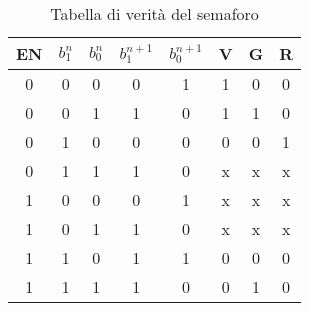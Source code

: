 \begin{table}[h]
	\centering
	\begin{tabular}{cccccccc}		
		 EN& $b_{1}^{n}$& $b_{0}^{n}$& $b_{1}^{n+1}$& $b_{0}^{n+1}$ &V & G& R\\
		 \midrule 
		  0 & 0 & 0 & 0 & 1 & 1 & 0 & 0 \\
		  0 & 0 & 1 & 1 & 0 & 1 & 1 & 0 \\
		  0 & 1 & 0 & 0 & 0 & 0 & 0 & 1 \\
          0 & 1 & 1 & 1 & 0 & x & x & x \\
		  1 & 0 & 0 & 0 & 1 & x & x & x \\
		  1 & 0 & 1 & 1 & 0 & x & x & x \\
		  1 & 1 & 0 & 1 & 1 & 0 & 0 & 0 \\
          1 & 1 & 1 & 1 & 0 & 0 & 1 & 0 \\          
 	\end{tabular}
	\caption{ Tabella di verità del semaforo }
	\label{t:tabella_verità}
\end{table}